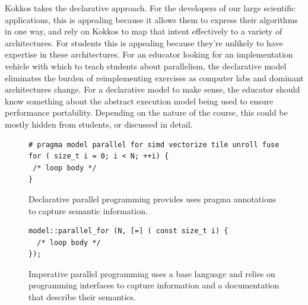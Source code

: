 Kokkos takes the declarative approach. For the developers of our large scientific applications, this is appealing because it allows them to express their algorithms in one way, and rely on Kokkos to map that intent effectively to a variety of architectures. For students this is appealing because they're unlikely to have expertise in these architectures. For an educator looking for an implementation vehicle with which to teach students about parallelism, the declarative model eliminates the burden of reimplementing exercises as computer labs and dominant architectures change. For a declarative model to make sense, the educator should know something about the abstract execution model being used to ensure performance portability. Depending on the nature of the course, this could be mostly hidden from students, or discussed in detail.

\begin{figure}
\begin{Verbatim}[frame=leftline]
# pragma model parallel for simd vectorize tile unroll fuse
for ( size_t i = 0; i < N; ++i) {
 /* loop body */
}
\end{Verbatim}
\caption{Declarative parallel programming provides uses pragma annotations to capture semantic information.}
\label{figOMPLike}
\end{figure}

\begin{figure}
\begin{Verbatim}[frame=leftline]
model::parallel_for (N, [=] ( const size_t i) {
  /* loop body */
});
\end{Verbatim}
\caption{Imperative parallel programming uses a base language and relies on programming interfaces to capture information and a documentation that describe their semantics.}
\label{figKokkosLike}
\end{figure}
